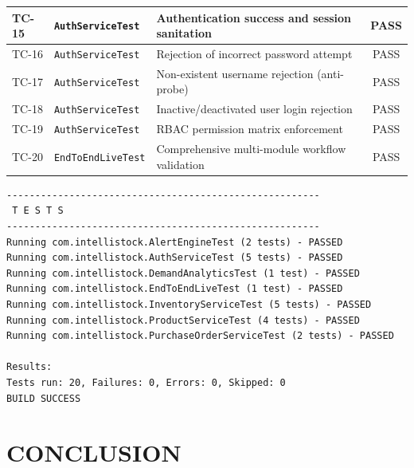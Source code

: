 \documentclass[BTech]{srmuthesis}
\begin{document}
\begin{table}[htpb]
\begin{tabular}{|l|l|l|c|}
TC-15 & \texttt{AuthServiceTest} & Authentication success and session sanitation & PASS \\ \hline
TC-16 & \texttt{AuthServiceTest} & Rejection of incorrect password attempt & PASS \\ \hline
TC-17 & \texttt{AuthServiceTest} & Non-existent username rejection (anti-probe) & PASS \\ \hline
TC-18 & \texttt{AuthServiceTest} & Inactive/deactivated user login rejection & PASS \\ \hline
TC-19 & \texttt{AuthServiceTest} & RBAC permission matrix enforcement & PASS \\ \hline
TC-20 & \texttt{EndToEndLiveTest} & Comprehensive multi-module workflow validation & PASS \\ \hline
\end{tabular}
\label{tab:test_matrix}
\end{table}

\begin{lstlisting}[caption={Automated Maven Surefire Test Execution Output}]
-------------------------------------------------------
 T E S T S
-------------------------------------------------------
Running com.intellistock.AlertEngineTest (2 tests) - PASSED
Running com.intellistock.AuthServiceTest (5 tests) - PASSED
Running com.intellistock.DemandAnalyticsTest (1 test) - PASSED
Running com.intellistock.EndToEndLiveTest (1 test) - PASSED
Running com.intellistock.InventoryServiceTest (5 tests) - PASSED
Running com.intellistock.ProductServiceTest (4 tests) - PASSED
Running com.intellistock.PurchaseOrderServiceTest (2 tests) - PASSED

Results:
Tests run: 20, Failures: 0, Errors: 0, Skipped: 0
BUILD SUCCESS
\end{lstlisting}

\chapter{CONCLUSION}
\label{chap:concl}
\end{document}
